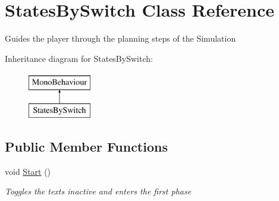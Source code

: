\hypertarget{class_states_by_switch}{}\section{States\+By\+Switch Class Reference}
\label{class_states_by_switch}


Guides the player through the planning steps of the Simulation  


Inheritance diagram for States\+By\+Switch\+:\begin{figure}[H]
\begin{center}
\leavevmode
\includegraphics[height=2.000000cm]{class_states_by_switch}
\end{center}
\end{figure}
\subsection*{Public Member Functions}
\begin{DoxyCompactItemize}
\item 
void \mbox{\hyperlink{class_states_by_switch_a21dce0c656d329bd4890e0ec07c6b8c9}{Start}} ()
\begin{DoxyCompactList}\small\item\em Toggles the texts inactive and enters the first phase \end{DoxyCompactList}\end{DoxyCompactItemize}

